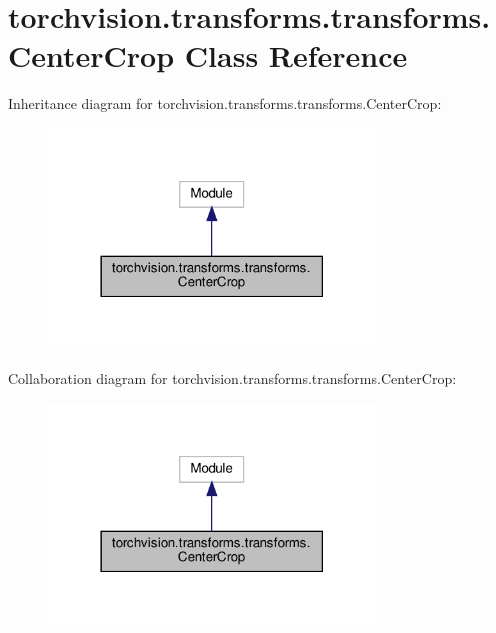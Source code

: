 \hypertarget{classtorchvision_1_1transforms_1_1transforms_1_1CenterCrop}{}\section{torchvision.\+transforms.\+transforms.\+Center\+Crop Class Reference}
\label{classtorchvision_1_1transforms_1_1transforms_1_1CenterCrop}


Inheritance diagram for torchvision.\+transforms.\+transforms.\+Center\+Crop\+:
\nopagebreak
\begin{figure}[H]
\begin{center}
\leavevmode
\includegraphics[width=246pt]{classtorchvision_1_1transforms_1_1transforms_1_1CenterCrop__inherit__graph}
\end{center}
\end{figure}


Collaboration diagram for torchvision.\+transforms.\+transforms.\+Center\+Crop\+:
\nopagebreak
\begin{figure}[H]
\begin{center}
\leavevmode
\includegraphics[width=246pt]{classtorchvision_1_1transforms_1_1transforms_1_1CenterCrop__coll__graph}
\end{center}
\end{figure}
